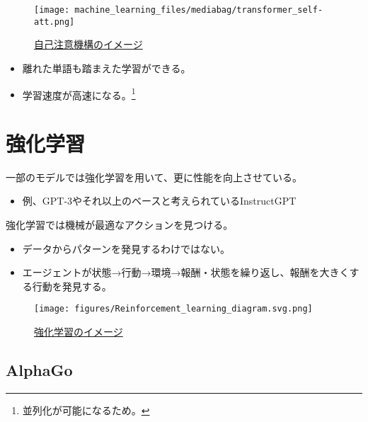 \documentclass[
  xelatex,
  ja=standard]{bxjsarticle}
\providecommand{\tightlist}{%
  \setlength{\itemsep}{0pt}\setlength{\parskip}{0pt}}\usepackage{longtable,booktabs,array}
\begin{document}
\begin{figure}[htpb]

{\centering \texttt{[image: machine\_learning\_files/mediabag/transformer\_self-att.png]}

}

\caption{\href{https://jalammar.github.io/illustrated-transformer/}{自己注意機構のイメージ}}

\end{figure}

\begin{itemize}
\tightlist
\item
  離れた単語も踏まえた学習ができる。
\item
  学習速度が高速になる。\footnote{並列化が可能になるため。}
\end{itemize}

\hypertarget{ux5f37ux5316ux5b66ux7fd2}{%
\section{強化学習}\label{ux5f37ux5316ux5b66ux7fd2}}

一部のモデルでは強化学習を用いて、更に性能を向上させている。

\begin{itemize}
\tightlist
\item
  例、GPT-3やそれ以上のベースと考えられているInstructGPT
\end{itemize}

強化学習では機械が最適なアクションを見つける。

\begin{itemize}
\tightlist
\item
  データからパターンを発見するわけではない。
\item
  エージェントが状態→行動→環境→報酬・状態を繰り返し、報酬を大きくする行動を発見する。
\end{itemize}

\begin{figure}[htpb]

{\centering \texttt{[image: figures/Reinforcement\_learning\_diagram.svg.png]}

}

\caption{\href{https://commons.wikimedia.org/wiki/File:Reinforcement_learning_diagram.svg}{強化学習のイメージ}}

\end{figure}

\hypertarget{alphago}{%
\subsection{AlphaGo}\label{alphago}}
\end{document}

